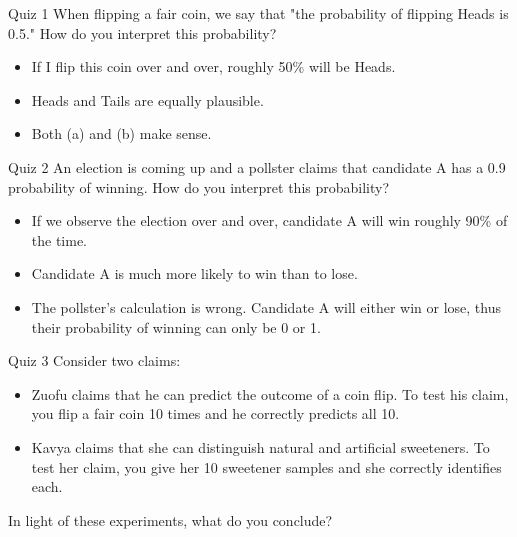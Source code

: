 \documentclass[12pt]{beamer}
\begin{document}
{
\begin{frame}{}
\begin{block}{Quiz 1}
When flipping a fair coin, we say that "the probability of flipping Heads is 0.5." How do you interpret this probability?
\begin{itemize}
\item[a.] If I flip this coin over and over, roughly 50\% will be Heads.
\item[b.] Heads and Tails are equally plausible.
\item[c.] Both (a) and (b) make sense.
\end{itemize}
\end{block}
\end{frame}

\begin{frame}{}
\begin{block}{Quiz 2}
An election is coming up and a pollster claims that candidate A has a 0.9 probability of winning. How do you interpret this probability?
\begin{itemize}
\item[a.] If we observe the election over and over, candidate A will win roughly 90\% of the time.
\item[b.] Candidate A is much more likely to win than to lose.
\item[c.] The pollster’s calculation is wrong. Candidate A will either win or lose, thus their probability of winning can only be 0 or 1.
\end{itemize}
\end{block}
\end{frame}

\begin{frame}{}
\begin{block}{Quiz 3}
Consider two claims:
\begin{itemize}
\item[1] Zuofu claims that he can predict the outcome of a coin flip. To test his claim, you flip a fair coin 10 times and he correctly predicts all 10.
\item[2] Kavya claims that she can distinguish natural and artificial sweeteners. To test her claim, you give her 10 sweetener samples and she correctly identifies each.
\end{itemize}

In light of these experiments, what do you conclude?


\end{block}
\end{frame}}
\end{document}
